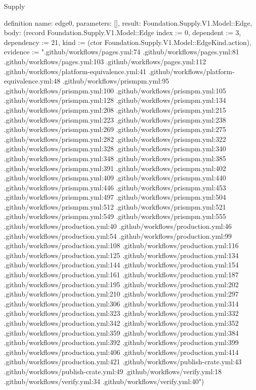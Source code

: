 \begin{lexlean}{Supply}
\begin{semanticmodule}
definition{
  name: edge0,
  parameters: [],
  result: Foundation.Supply.V1.Model::Edge,
  body: (record Foundation.Supply.V1.Model::Edge {index := 0, dependent := 3, dependency := 21, kind := (ctor Foundation.Supply.V1.Model::EdgeKind.action), evidence := ".github/workflows/pages.yml:74 .github/workflows/pages.yml:81 .github/workflows/pages.yml:103 .github/workflows/pages.yml:112 .github/workflows/platform-equivalence.yml:41 .github/workflows/platform-equivalence.yml:48 .github/workflows/prismpm.yml:95 .github/workflows/prismpm.yml:100 .github/workflows/prismpm.yml:105 .github/workflows/prismpm.yml:128 .github/workflows/prismpm.yml:134 .github/workflows/prismpm.yml:208 .github/workflows/prismpm.yml:215 .github/workflows/prismpm.yml:223 .github/workflows/prismpm.yml:238 .github/workflows/prismpm.yml:269 .github/workflows/prismpm.yml:275 .github/workflows/prismpm.yml:282 .github/workflows/prismpm.yml:322 .github/workflows/prismpm.yml:328 .github/workflows/prismpm.yml:340 .github/workflows/prismpm.yml:348 .github/workflows/prismpm.yml:385 .github/workflows/prismpm.yml:391 .github/workflows/prismpm.yml:402 .github/workflows/prismpm.yml:409 .github/workflows/prismpm.yml:440 .github/workflows/prismpm.yml:446 .github/workflows/prismpm.yml:453 .github/workflows/prismpm.yml:497 .github/workflows/prismpm.yml:504 .github/workflows/prismpm.yml:512 .github/workflows/prismpm.yml:521 .github/workflows/prismpm.yml:549 .github/workflows/prismpm.yml:555 .github/workflows/production.yml:40 .github/workflows/production.yml:46 .github/workflows/production.yml:54 .github/workflows/production.yml:99 .github/workflows/production.yml:108 .github/workflows/production.yml:116 .github/workflows/production.yml:125 .github/workflows/production.yml:134 .github/workflows/production.yml:144 .github/workflows/production.yml:154 .github/workflows/production.yml:161 .github/workflows/production.yml:187 .github/workflows/production.yml:195 .github/workflows/production.yml:202 .github/workflows/production.yml:210 .github/workflows/production.yml:297 .github/workflows/production.yml:306 .github/workflows/production.yml:314 .github/workflows/production.yml:323 .github/workflows/production.yml:332 .github/workflows/production.yml:342 .github/workflows/production.yml:352 .github/workflows/production.yml:359 .github/workflows/production.yml:384 .github/workflows/production.yml:392 .github/workflows/production.yml:399 .github/workflows/production.yml:406 .github/workflows/production.yml:414 .github/workflows/production.yml:421 .github/workflows/publish-crate.yml:43 .github/workflows/publish-crate.yml:49 .github/workflows/verify.yml:18 .github/workflows/verify.yml:34 .github/workflows/verify.yml:40"})
}


\end{semanticmodule}
\end{lexlean}
